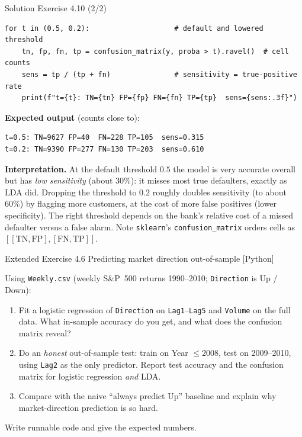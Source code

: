 \documentclass[aspectratio=169,11pt]{beamer}
\begin{document}
\begin{frame}[fragile]{Solution \textemdash{} Exercise 4.10 (2/2)}
\begin{solutionbox}
\begin{lstlisting}
for t in (0.5, 0.2):                    # default and lowered threshold
    tn, fp, fn, tp = confusion_matrix(y, proba > t).ravel()  # cell counts
    sens = tp / (tp + fn)               # sensitivity = true-positive rate
    print(f"t={t}: TN={tn} FP={fp} FN={fn} TP={tp}  sens={sens:.3f}")
\end{lstlisting}

\textbf{Expected output} (counts close to):
\begin{lstlisting}
t=0.5: TN=9627 FP=40  FN=228 TP=105  sens=0.315
t=0.2: TN=9390 FP=277 FN=130 TP=203  sens=0.610
\end{lstlisting}

\textbf{Interpretation.} At the default threshold $0.5$ the model is
very accurate overall but has \emph{low sensitivity} (about $30\%$): it
misses most true defaulters, exactly as LDA did. Dropping the threshold
to $0.2$ roughly doubles sensitivity (to about $60\%$) by flagging more
customers, at the cost of more false positives (lower specificity). The
right threshold depends on the bank's relative cost of a missed
defaulter versus a false alarm. Note \texttt{sklearn}'s
\texttt{confusion\_matrix} orders cells as
$[[\mathrm{TN},\mathrm{FP}],[\mathrm{FN},\mathrm{TP}]]$.
\end{solutionbox}
\end{frame}

\begin{frame}{Extended Exercise 4.6 \textemdash{} Predicting market direction out-of-sample [Python]}
\begin{longexercise}
Using \texttt{Weekly.csv} (weekly S\&P~500 returns 1990--2010;
\texttt{Direction} is Up / Down):
\begin{enumerate}
  \item Fit a logistic regression of \texttt{Direction} on
        \texttt{Lag1}--\texttt{Lag5} and \texttt{Volume} on the full data.
        What in-sample accuracy do you get, and what does the confusion
        matrix reveal?
  \item Do an \emph{honest} out-of-sample test: train on
        Year $\le 2008$, test on 2009--2010, using \texttt{Lag2} as the
        only predictor. Report test accuracy and the confusion matrix for
        logistic regression \emph{and} LDA.
  \item Compare with the naive ``always predict Up'' baseline and explain
        why market-direction prediction is so hard.
\end{enumerate}
Write runnable code and give the expected numbers.
\end{longexercise}
\end{frame}
\end{document}
